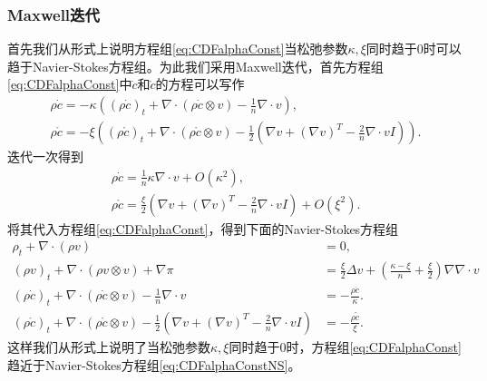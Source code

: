 	\subsubsection{Maxwell迭代}
	首先我们从形式上说明方程组\eqref{eq:CDFalphaConst}当松弛参数$\kappa,\xi$同时趋于$0$时可以趋于Navier-Stokes方程组。为此我们采用Maxwell迭代，首先方程组\eqref{eq:CDFalphaConst}中$\dot{c}$和$\mathring{c}$的方程可以写作
	\begin{eqnarray*}
			\rho \dot{c} = - \kappa \left( (\rho \dot{c})_t  + \nabla \cdot(\rho \dot{c} \otimes v) - \frac{1}{n} \nabla \cdot v  \right), \\
			\rho \mathring{c} = -\xi \left( (\rho \mathring{c})_t + \nabla \cdot (\rho \mathring{c} \otimes v) - \frac{1}{2} (\nabla v + (\nabla v)^T - \frac{2}{n} \nabla \cdot v I) \right).
	\end{eqnarray*}
	迭代一次得到
	\begin{eqnarray*}
		\rho \dot{c} = \frac{1}{n} \kappa \nabla \cdot v + O(\kappa^2), \\
		\rho \mathring{c} =  \frac{\xi}{2}  (\nabla v + (\nabla v)^T - \frac{2}{n} \nabla \cdot v I) + O(\xi^2).
	\end{eqnarray*}
	将其代入方程组\eqref{eq:CDFalphaConst}，得到下面的Navier-Stokes方程组
	\begin{subequations}\label{eq:CDFalphaConstNS}
		\begin{align}
			\rho_t + \nabla \cdot (\rho v) &=0, \\
			(\rho v)_t + \nabla \cdot (\rho v \otimes v) + \nabla \pi &= \frac{\xi}{2} \Delta v + (\frac{\kappa - \xi}{n} + \frac{\xi}{2}) \nabla \nabla \cdot  v \\ %
			(\rho \dot{c})_t  + \nabla \cdot(\rho \dot{c} \otimes v) -  \frac{1}{n} \nabla \cdot v &= - \frac{\rho \dot{c}}{\kappa}. \\
			(\rho \mathring{c})_t + \nabla \cdot (\rho \mathring{c} \otimes v) - \frac{1}{2} (\nabla v + (\nabla v)^T - \frac{2}{n} \nabla \cdot v I) &= - \frac{\rho \mathring{c}}{\xi}.
		\end{align}
	\end{subequations}
	这样我们从形式上说明了当松弛参数$\kappa,\xi$同时趋于$0$时，方程组\eqref{eq:CDFalphaConst}趋近于Navier-Stokes方程组\eqref{eq:CDFalphaConstNS}。

